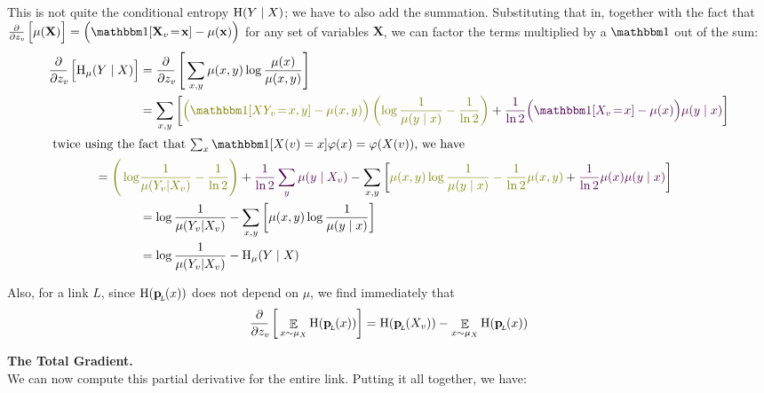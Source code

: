 \documentclass{article}
\newcommand{\bp}[1][L]{\mat{p}_{\!_#1\!}}
\begin{document}
	This is not quite the conditional entropy $\mathrm{H}(Y\mid X)$; we have to also add the summation. Substituting that in, together with the fact that $\pz{\mu(\mathbf X)} = \Big(\mathbbm1[\mathbf X_v \!=\! \mathbf x] - \mu(\mathbf x)\Big)$ for any set of variables $\mathbf X$, we can factor the terms multiplied by a $\mathbbm1$ out of the sum:
	\begin{align*}
		\pz{\H_\mu(Y \mid X)} &= \pz{\sum_{x,y}\mu(x,y) \log \frac{\mu(x)}{\mu(x,y)}} \\
			&= \sum_{x,y} \left[ {\color{t1}\Big(\mathbbm1[XY_v \!=\! x,y] - \mu(x,y)\Big)\left(\log \frac{1}{\mu(y \mid x)} - \frac{1}{\ln 2}\right)} + {\color{t2}\frac{1}{\ln 2} \Big(\mathbbm1[X_v \!=\! x] - \mu(x)\Big) \mu(y \mid x)} \right] \\
\intertext{
	twice using the fact that $\sum_x \mathbbm1[X(v) = x]\varphi(x) = \varphi(X(v))$, we have
}
			= \color{t1}\Bigg(\log&{\color{t1} \frac{1}{\mu(Y_v | X_v)} - \frac{1}{\ln 2}\Bigg)}
			 +{ \color{t2}\frac{1}{\ln 2} \sum_{y} \mu(y \mid X_v)} - \sum_{x,y} \left[ {\color{t1}\mu(x,y) \log\frac{1}{\mu(y\mid x)} -\frac{1}{\ln2} \mu(x,y)} + {\color{t2}\frac{1}{\ln2} \mu(x)\mu(y\mid x)} \right] \\
			&= \log \frac{1}{\mu(Y_v | X_v)} - \sum_{x,y} \left[\mu(x,y) \log\frac{1}{\mu(y\mid x)} \right] \\
			&= \log \frac{1}{\mu(Y_v | X_v)} - \H_\mu(Y \mid X)
	\end{align*}
	
	Also, for a link $L$, since $\H(\bp(x))$ does not depend on $\mu$, we find immediately that 
	\[\pz{ \E_{x \sim \mu_X} \H(\bp(x)) }  = \H(\bp(X_v)) - \E_{x \sim \mu_X} \H(\bp(x))  \] 
	\endgroup
	
	\textbf{The Total Gradient.}\\
	We can now compute this partial derivative for the entire link. Putting it all together, we have:
	
\end{document}

